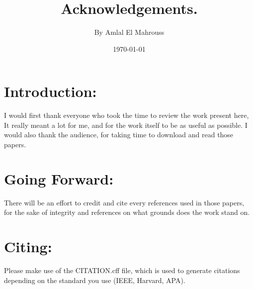 \documentclass[10pt]{article}
\title{%
	\vspace{-1.5em}%
	\large\textbf{Acknowledgements.}%
}
\author{By Amlal El Mahrouss}
\date{\today}
\theoremstyle{plain}
\theoremstyle{definition}
\theoremstyle{remark}
\begin{document}

\maketitle

\section{Introduction:}

I would first thank everyone who took the time to review the work present here, It really meant a lot for me, and for the work itself to be as useful as possible. I would also thank the audience, for taking time to download and read those papers.

\section{Going Forward:}

There will be an effort to credit and cite every references used in those papers, for the sake of integrity and references on what grounds does the work stand on.

\section{Citing:}

Please make use of the CITATION.cff file, which is used to generate citations depending on the standard you use (IEEE, Harvard, APA).

\end{document}
